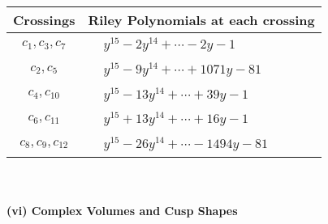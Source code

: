 \documentclass[1p]{elsarticle_modified}
\theoremstyle{definition}
\begin{document}
\begin{tabular}{m{50pt}|m{274pt}}
Crossings & \hspace{64pt}Riley Polynomials at each crossing \\
\hline $$\begin{aligned}c_{1},c_{3},c_{7}\end{aligned}$$&$\begin{aligned}
&y^{15}-2 y^{14}+\cdots-2 y-1
\end{aligned}$\\
\hline $$\begin{aligned}c_{2},c_{5}\end{aligned}$$&$\begin{aligned}
&y^{15}-9 y^{14}+\cdots+1071 y-81
\end{aligned}$\\
\hline $$\begin{aligned}c_{4},c_{10}\end{aligned}$$&$\begin{aligned}
&y^{15}-13 y^{14}+\cdots+39 y-1
\end{aligned}$\\
\hline $$\begin{aligned}c_{6},c_{11}\end{aligned}$$&$\begin{aligned}
&y^{15}+13 y^{14}+\cdots+16 y-1
\end{aligned}$\\
\hline $$\begin{aligned}c_{8},c_{9},c_{12}\end{aligned}$$&$\begin{aligned}
&y^{15}-26 y^{14}+\cdots-1494 y-81
\end{aligned}$\\
\hline
\end{tabular}\\~\\
\newpage\flushleft \textbf{(vi) Complex Volumes and Cusp Shapes}
\end{document}
